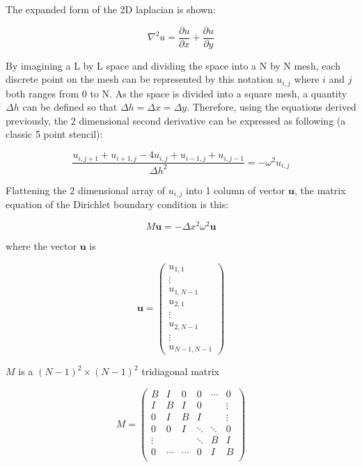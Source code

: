 The expanded form of the 2D laplacian is shown:

\begin{equation}
    \nabla^2 u = \frac{\partial u}{\partial x} + \frac{\partial u}{\partial y}
\end{equation}

By imagining a L by L space and dividing the space into a N by N mesh, each discrete point on the mesh can be represented by this notation $u_{i,j}$ where $i$ and $j$ both ranges from 0 to N. As the space is divided into a square mesh, a quantity $\Delta h$ can be defined so that $\Delta h = \Delta x = \Delta y$. Therefore, using the equations derived previously, the 2 dimensional second derivative can be expressed as following (a classic 5 point stencil):

\begin{equation}
    \frac{u_{i,j+1}+u_{i+1,j}-4u_{i,j}+u_{i-1,j}+u_{i,j-1}}{\Delta h^2} = -\omega^2 u_{i,j}
\end{equation}

Flattening the 2 dimensional array of $u_{i,j}$ into 1 column of vector $\mathbf{u}$, the matrix equation of the Dirichlet boundary condition is this:

\begin{equation}
    M \mathbf{u} = -\Delta x^2\omega^2 \mathbf{u}
\end{equation}

where the vector $\mathbf{u}$ is 

\begin{equation}
    \mathbf{u} = 
\begin{pmatrix}
    u_{1,1}\\
    \vdots\\
    u_{1,N-1}\\
    u_{2,1}\\
    \vdots\\
    u_{2,N-1}\\
    \vdots\\
    u_{N-1,N-1}
\end{pmatrix}
\end{equation}

$M$ is a $(N-1)^2 \times (N-1)^2$ tridiagonal matrix

\begin{equation}
    M =
\begin{pmatrix}
    B     &     I&     0&     0&\cdots&      0\\
    I     &     B&     I&     0&      & \vdots\\
    0     &     I&     B&     I&      & \vdots\\
    0     &     0&     I&\ddots&\ddots&      0\\
    \vdots&      &      &\ddots&     B&      I\\
    0     &\cdots&\cdots&     0&     I&      B\\
\end{pmatrix}
\end{equation}

